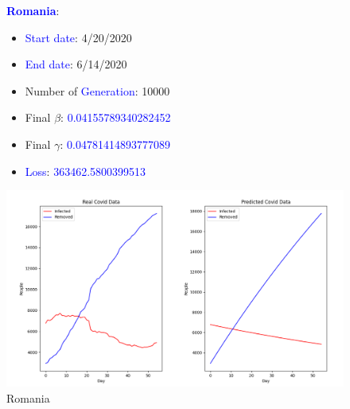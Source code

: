 \documentclass[a4paper]{article}
\begin{document}
    \begin{figure}[ht]
    \centering
    \textbf{\textcolor{blue}{Romania}}: 
    \begin{itemize}
        \item \textcolor{blue}{Start date}: 4/20/2020
        \item \textcolor{blue}{End date}: 6/14/2020
        \item Number of \textcolor{blue}{Generation}: 10000
        \item Final $\beta$: \textcolor{blue}{0.04155789340282452}
        \item Final $\gamma$: \textcolor{blue}{0.04781414893777089}
        \item \textcolor{blue}{Loss}: \textcolor{blue}{363462.5800399513}
    \end{itemize}
    \includegraphics[width= \linewidth]{ex5-plot/Romania.png}
    \caption{Romania}
     \end{figure}
\end{document}
